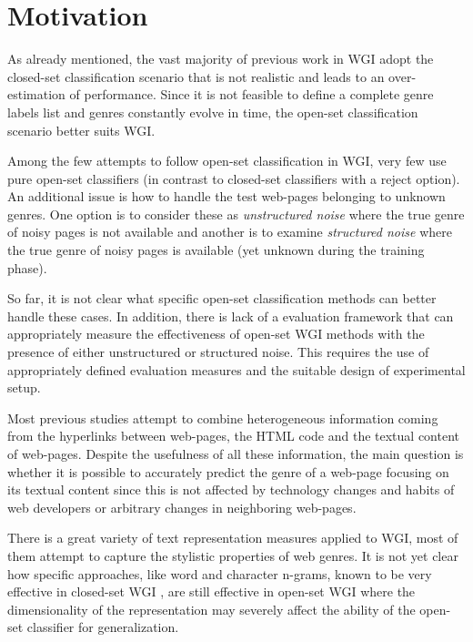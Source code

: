 \section{Motivation} 
\label{chap:introduction:sec:motivation_objective}

As already mentioned, the vast majority of previous work in WGI adopt the closed-set classification scenario that is not realistic and leads to an over-estimation of performance. Since it is not feasible to define a complete genre labels list and genres constantly evolve in time, the open-set classification scenario better suits WGI. 

Among the few attempts to follow open-set classification in WGI, very few use pure open-set classifiers (in contrast to closed-set classifiers with a reject option). An additional issue is how to handle the test web-pages belonging to unknown genres. One option is to consider these as \textit{unstructured noise} where the true genre of noisy pages is not available and another is to examine \textit{structured noise} where the true genre of noisy pages is available (yet unknown during the training phase). 

So far, it is not clear what specific open-set classification methods can better handle these cases. In addition, there is lack of a evaluation framework that can appropriately measure the effectiveness of open-set WGI methods with the presence of either unstructured or structured noise. This requires the use of appropriately defined evaluation measures and the suitable design of experimental setup.

Most previous studies attempt to combine heterogeneous information coming from the hyperlinks between web-pages, the HTML code and the textual content of web-pages. Despite the usefulness of all these information, the main question is whether it is possible to accurately predict the genre of a web-page focusing on its textual content since this is not affected by technology changes and habits of web developers or arbitrary changes in neighboring web-pages. 

There is a great variety of text representation measures applied to WGI, most of them attempt to capture the stylistic properties of web genres. It is not yet clear how specific approaches, like word and character n-grams, known to be very effective in closed-set WGI \parencite{sharoff2010web}, are still effective in open-set WGI where the dimensionality of the representation may severely affect the ability of the open-set classifier for  generalization.

